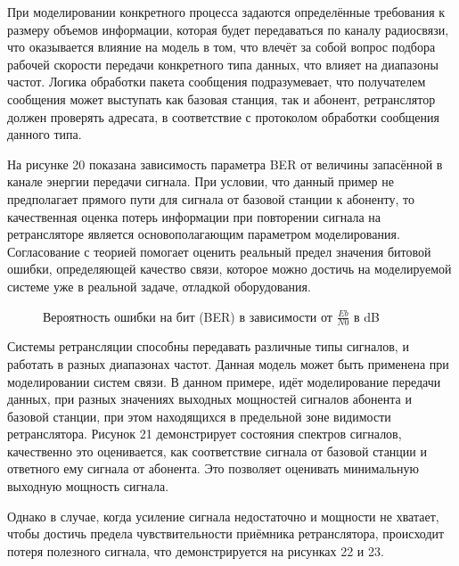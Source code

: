 \begin{onehalfspace}

При моделировании конкретного процесса задаются определённые требования к размеру объемов информации, которая будет передаваться по каналу радиосвязи, что оказывается влияние на модель в том, что влечёт за собой вопрос подбора рабочей скорости передачи конкретного типа данных, что влияет на диапазоны частот. Логика обработки пакета сообщения подразумевает, что получателем сообщения может выступать как базовая станция, так и абонент, ретранслятор должен проверять адресата, в соответствие с протоколом обработки сообщения данного типа.


На рисунке 20 показана зависимость параметра BER от величины запасённой в канале энергии передачи сигнала. При условии, что данный пример не предполагает прямого пути для сигнала от базовой станции к абоненту, то качественная оценка потерь информации при повторении сигнала на ретрансляторе является основополагающим параметром моделирования. Согласование с теорией помогает оценить реальный предел значения битовой ошибки, определяющей качество связи, которое можно достичь на моделируемой системе уже в реальной задаче, отладкой оборудования. 

\end{onehalfspace}

\begin{figure}[h]
		\begin{minipage}[h]{0.49\linewidth}
		\end{minipage}
		\hfill
		\begin{minipage}[h]{0.49\linewidth}
		\end{minipage}
		\caption{Вероятность ошибки на бит (BER) в зависимости от $\frac{Eb}{N0}$ в dB}
		\label{fig:model20}
	\end{figure}


\begin{onehalfspace}


Системы ретрансляции способны передавать различные типы сигналов, и работать в разных диапазонах частот. Данная модель может быть применена при моделировании систем связи. В данном примере, идёт моделирование передачи данных, при разных значениях выходных мощностей сигналов абонента и базовой станции, при этом находящихся в предельной зоне видимости ретранслятора. Рисунок 21 демонстрирует состояния спектров сигналов, качественно это оценивается, как соответствие сигнала от базовой станции и ответного ему сигнала от абонента. Это позволяет оценивать минимальную выходную мощность сигнала.

Однако в случае, когда усиление сигнала недостаточно и мощности не хватает, чтобы достичь предела чувствительности приёмника ретранслятора, происходит потеря полезного сигнала, что демонстрируется на рисунках 22 и 23.
\end{onehalfspace}

